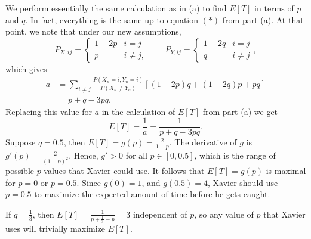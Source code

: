 \documentclass{homework}
\begin{document}
\begin{alphaparts}
		\questionpart We perform essentially the same calculation as in (a) to find $E[T]$ in terms of $p$ and $q$. In fact, everything is the same up to equation $(*)$ from part (a). At that point, we note that under our new assumptions,
		\begin{equation*}
			P_{X,ij} = \begin{cases}
				1-2p & i = j\\
				p & i \ne j,
			\end{cases}
			\qquad
			P_{Y,ij} = \begin{cases}
				1-2q & i = j \\
				q & i\ne j
			\end{cases},
		\end{equation*}
		which gives
		\begin{align*}
			a &= \sum_{i\ne j}\frac{P(X_n =i, Y_n=i)}{P(X_n\ne Y_n)}[(1-2p)q + (1-2q)p + pq] \\
			&= p + q - 3pq.
		\end{align*}
		Replacing this value for $a$ in the calculation of $E[T]$ from part (a) we get
		\begin{equation*}
			E[T] = \frac{1}{a} = \frac{1}{p + q - 3pq}.
		\end{equation*}
		Suppose $q = 0.5$, then $E[T] = g(p) = \frac{2}{1 -p}$. The derivative of $g$ is $g'(p) = \frac{2}{(1-p)^2}$. Hence, $g' > 0$ for all $p \in [0, 0.5]$, which is the range of possible $p$ values that Xavier could use. It follows that $E[T] = g(p)$ is maximal for $p = 0$ or $p=0.5$. Since $g(0) = 1$, and $g(0.5) = 4$, Xavier should use $p = 0.5$ to maximize the expected amount of time before he gets caught.
		
		If $q = \frac{1}{3}$, then $E[T] = \frac{1}{p + \frac{1}{3} - p}= 3$ independent of $p$, so any value of $p$ that Xavier uses will trivially maximize $E[T]$.
	\end{alphaparts}
	
	\question 
	
	
	
\end{document}
